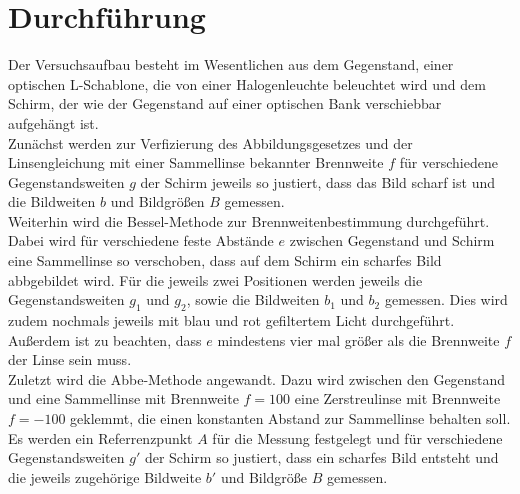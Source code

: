 \section{Durchführung}
\label{sec:Durchführung}

Der Versuchsaufbau besteht im Wesentlichen aus dem Gegenstand, einer optischen L-Schablone,
die von einer Halogenleuchte beleuchtet wird und dem Schirm, der wie der Gegenstand auf
einer optischen Bank verschiebbar aufgehängt ist. \\

Zunächst werden zur Verfizierung des Abbildungsgesetzes und der Linsengleichung
mit einer Sammellinse bekannter Brennweite $f$ für verschiedene Gegenstandsweiten $g$
der Schirm jeweils so justiert, dass das Bild scharf ist und die Bildweiten $b$ und Bildgrößen $B$ 
gemessen.\\

Weiterhin wird die Bessel-Methode zur Brennweitenbestimmung durchgeführt.
Dabei wird für verschiedene feste Abstände $e$ zwischen Gegenstand und Schirm eine Sammellinse so verschoben,
dass auf dem Schirm ein scharfes Bild abbgebildet wird. Für die jeweils zwei Positionen werden
jeweils die Gegenstandsweiten $g_1$ und $g_2$, sowie die Bildweiten $b_1$ und $b_2$ gemessen.
Dies wird zudem nochmals jeweils mit blau und rot gefiltertem Licht durchgeführt.
Außerdem ist zu beachten, dass $e$ mindestens vier mal größer als die Brennweite $f$ der Linse sein muss.\\

Zuletzt wird die Abbe-Methode angewandt. Dazu wird zwischen den Gegenstand und eine Sammellinse mit
Brennweite $f = 100$ eine Zerstreulinse mit Brennweite $f = -100$ geklemmt, die einen konstanten
Abstand zur Sammellinse behalten soll. Es werden ein Referrenzpunkt $A$ für die Messung festgelegt
und für verschiedene Gegenstandsweiten $g'$ der Schirm so justiert, dass ein scharfes Bild entsteht und die
jeweils zugehörige Bildweite $b'$ und Bildgröße $B$ gemessen. 


